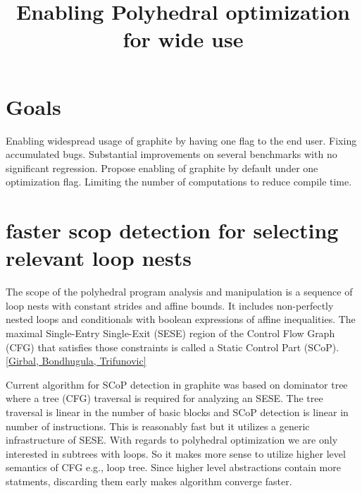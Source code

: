 \title{Enabling Polyhedral optimization for wide use}


\section{Goals}
Enabling widespread usage of graphite by having one flag to the end user.
Fixing accumulated bugs.
Substantial improvements on several benchmarks with no significant regression.
Propose enabling of graphite by default under one optimization flag.
Limiting the number of computations to reduce compile time.

\section{faster scop detection for selecting relevant loop nests}
The scope of the polyhedral program analysis and manipulation is a sequence of loop
nests with constant strides and affine bounds. It includes non-perfectly nested loops
and conditionals with boolean expressions of affine inequalities.
The maximal Single-Entry Single-Exit (SESE) region of the Control Flow Graph
(CFG) that satisfies those constraints is called a Static Control Part (SCoP). \ref{Girbal, Bondhugula, Trifunovic}

Current algorithm for SCoP detection in graphite was based on dominator tree where a tree (CFG) traversal is required
for analyzing an SESE. The tree traversal is linear in the number of basic blocks and SCoP detection is linear in
number of instructions. This is reasonably fast but it utilizes a generic infrastructure of SESE. With regards to
polyhedral optimization we are only interested in subtrees with loops. So it makes more sense to utilize higher level
semantics of CFG e.g., loop tree. Since higher level abstractions contain more statments, discarding them early
makes algorithm converge faster.

